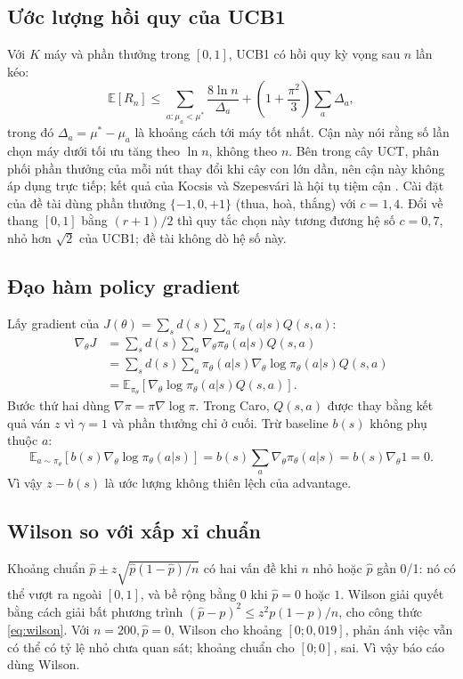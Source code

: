 \subsection{Ước lượng hồi quy của UCB1}
Với $K$ máy và phần thưởng trong $[0,1]$, UCB1 có hồi quy kỳ vọng sau $n$ lần kéo:
\begin{equation}
  \mathbb{E}[R_n] \le \sum_{a:\mu_a<\mu^*} \frac{8\ln n}{\Delta_a}
  + \left(1+\frac{\pi^2}{3}\right)\sum_a \Delta_a,
  \label{eq:ucb-regret}
\end{equation}
trong đó $\Delta_a=\mu^*-\mu_a$ là khoảng cách tới máy tốt nhất. Cận này nói rằng số lần chọn
máy dưới tối ưu tăng theo $\ln n$, không theo $n$. Bên trong cây UCT, phân phối phần thưởng của
mỗi nút thay đổi khi cây con lớn dần, nên cận này không áp dụng trực tiếp; kết quả của Kocsis và
Szepesvári là hội tụ tiệm cận \cite{kocsis2006uct}. Cài đặt của đề tài dùng phần thưởng
$\{-1,0,+1\}$ (thua, hoà, thắng) với $c=1{,}4$. Đổi về thang $[0,1]$ bằng $(r+1)/2$ thì quy tắc chọn
này tương đương hệ số $c=0{,}7$, nhỏ hơn $\sqrt2$ của UCB1; đề tài không dò hệ số này.

\subsection{Đạo hàm policy gradient}
Lấy gradient của $J(\theta)=\sum_s d(s)\sum_a \pi_\theta(a|s)Q(s,a)$:
\begin{align}
  \nabla_\theta J &= \sum_s d(s)\sum_a \nabla_\theta\pi_\theta(a|s)Q(s,a) \\
  &= \sum_s d(s)\sum_a \pi_\theta(a|s)\nabla_\theta\log\pi_\theta(a|s)Q(s,a) \\
  &= \mathbb{E}_{\pi_\theta}\left[\nabla_\theta\log\pi_\theta(a|s)Q(s,a)\right].
\end{align}
Bước thứ hai dùng $\nabla\pi=\pi\nabla\log\pi$. Trong Caro, $Q(s,a)$ được thay bằng kết quả ván
$z$ vì $\gamma=1$ và phần thưởng chỉ ở cuối. Trừ baseline $b(s)$ không phụ thuộc $a$:
\begin{equation}
  \mathbb{E}_{a\sim\pi_\theta}\left[b(s)\nabla_\theta\log\pi_\theta(a|s)\right]
  = b(s)\sum_a\nabla_\theta\pi_\theta(a|s)=b(s)\nabla_\theta 1=0.
\end{equation}
Vì vậy $z-b(s)$ là ước lượng không thiên lệch của advantage.

\subsection{Wilson so với xấp xỉ chuẩn}
Khoảng chuẩn $\hat p\pm z\sqrt{\hat p(1-\hat p)/n}$ có hai vấn đề khi $n$ nhỏ hoặc $\hat p$ gần
0/1: nó có thể vượt ra ngoài $[0,1]$, và bề rộng bằng 0 khi $\hat p=0$ hoặc $1$. Wilson giải
quyết bằng cách giải bất phương trình $( \hat p-p )^2 \le z^2 p(1-p)/n$, cho công thức
\eqref{eq:wilson}. Với $n=200,\hat p=0$, Wilson cho khoảng $[0;0{,}019]$, phản ánh việc vẫn có
thể có tỷ lệ nhỏ chưa quan sát; khoảng chuẩn cho $[0;0]$, sai. Vì vậy báo cáo dùng Wilson.

